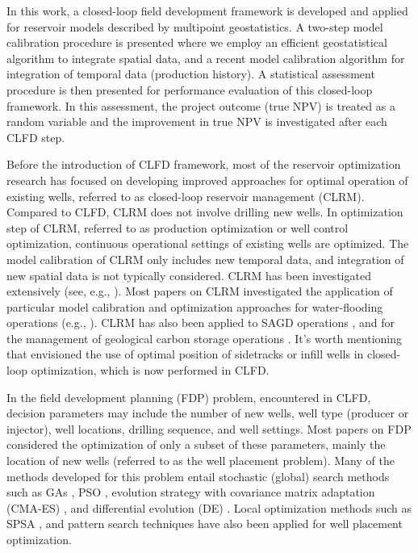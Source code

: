 \documentclass[11pt]{article}
\begin{document}
In this work, a closed-loop field development framework is developed and applied for
reservoir models described by multipoint geostatistics.
A two-step model calibration procedure is presented where we employ an efficient geostatistical algorithm
to integrate spatial data, and a recent model calibration algorithm for integration
of temporal data (production history).
A statistical assessment procedure is then presented for performance evaluation of this closed-loop framework.
In this assessment, the project outcome (true NPV) is treated as a random variable
and the improvement in true NPV is investigated after each CLFD step.


Before the introduction of CLFD framework, most of the reservoir optimization research
has focused on developing improved approaches for optimal operation of existing wells,
referred to as closed-loop reservoir management (CLRM).
Compared to CLFD, CLRM does not involve drilling new wells.
In optimization step of CLRM,
referred to as production optimization or well control optimization, continuous operational settings of existing
wells are optimized. The model calibration of CLRM only includes new temporal data, and integration of new spatial data
is not typically considered.
CLRM has been investigated extensively (see, e.g., \citet{jansen:09,jansen:05}).
Most papers on CLRM investigated the application of particular model calibration and optimization approaches for water-flooding operations (e.g., \citet{aitokhuehi:05,chen:09ens}).
CLRM has also been applied to SAGD operations \citep{regtien:10},
and for the management of geological carbon storage operations \citep{cameron:14}.
It's worth mentioning that \citet{jansen:05,jansen:09} envisioned the use of optimal position of sidetracks or infill wells in closed-loop optimization,
which is now performed in CLFD.


In the field development planning (FDP) problem, encountered in CLFD, decision parameters may include the number of new wells,
well type (producer or injector), well locations, drilling sequence, and well settings.
Most papers on FDP considered the optimization of only a subset of these parameters, mainly the location
of new wells (referred to as the well placement problem).
Many of the methods developed for this problem entail stochastic (global) search methods such as GAs \citep{ozdogan:06},
PSO \citep{onwunalu:10,arnold:16},
evolution strategy with covariance matrix adaptation (CMA-ES) \citep{bayer:07,bayer:08,bouzarkouna:12},
and differential evolution (DE) \citep{bayer:10,nwankwor:13}.
Local optimization methods such as SPSA \citep{shirangi:12},
and pattern search techniques \citep{wilson:13,cameron:12} have also been applied for well placement optimization.
\end{document}
